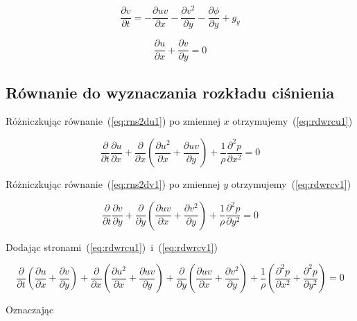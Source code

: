 \documentclass[a4paper,10pt]{article}
\begin{document}
	\begin{equation}
		\label{eq:rns2dv1}
		\frac{\partial v}{\partial t} = -\frac{\partial uv}{\partial x} - \frac{\partial v^2}{\partial y} - \frac{\partial \phi}{\partial y} + g_y 
	\end{equation}

	\begin{equation}
		\frac{\partial u}{\partial x} + \frac{\partial v}{\partial y} = 0
	\end{equation}

  \subsection{Równanie do wyznaczania rozkładu ciśnienia}

	Różniczkując równanie~(\ref{eq:rns2du1}) po zmiennej $x$ otrzymujemy~(\ref{eq:rdwrcu1})

	\begin{equation}
		\label{eq:rdwrcu1}
		\frac{\partial}{\partial t} \frac{\partial u}{\partial x} + \frac{\partial}{\partial x} \left (  \frac{\partial u^2}{\partial x} + \frac{\partial uv}{\partial y} \right )
		+ \frac{1}{\rho} \frac{\partial^2 p}{\partial x^2} = 0
	\end{equation}

	Różniczkując równanie~(\ref{eq:rns2dv1}) po zmiennej $y$ otrzymujemy~(\ref{eq:rdwrcv1})

	\begin{equation}
		\label{eq:rdwrcv1}
		\frac{\partial}{\partial t} \frac{\partial v}{\partial y} + \frac{\partial}{\partial y} \left (  \frac{\partial uv}{\partial x} + \frac{\partial v^2}{\partial y} \right )
		+ \frac{1}{\rho} \frac{\partial^2 p}{\partial y^2} = 0
	\end{equation}

	Dodając stronami~(\ref{eq:rdwrcu1})~i~(\ref{eq:rdwrcv1})

	\begin{equation}
		\label{eq:rdwrc1}
		\frac{\partial}{\partial t} \left ( \frac{\partial u}{\partial x} + \frac{\partial v}{\partial y} \right ) 
		+ \frac{\partial}{\partial x} \left (  \frac{\partial u^2}{\partial x} + \frac{\partial uv}{\partial y} \right )
		+ \frac{\partial}{\partial y} \left (  \frac{\partial uv}{\partial x} + \frac{\partial v^2}{\partial y} \right )
		+ \frac{1}{\rho} \left (  \frac{\partial^2 p}{\partial x^2} + \frac{\partial^2 p}{\partial y^2} \right ) = 0
	\end{equation}

	Oznaczając
\end{document}
